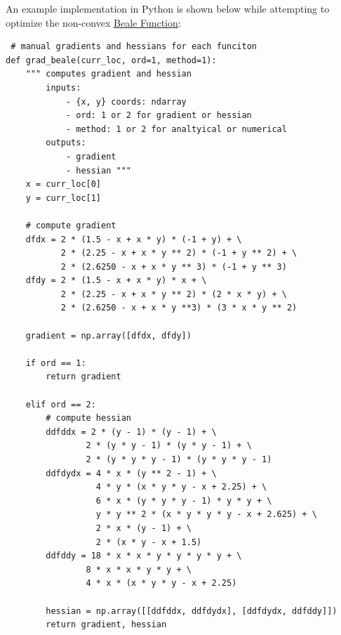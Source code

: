 \begin{tcolorbox}[colback=gray!5!white,colframe=gray!75!black]
 An example implementation in Python is shown below while attempting to optimize the non-convex \href{https://en.wikipedia.org/wiki/Test_functions_for_optimization}{Beale Function}:

 \begin{verbatim}
 # manual gradients and hessians for each funciton
def grad_beale(curr_loc, ord=1, method=1):
    """ computes gradient and hessian
        inputs:
            - {x, y} coords: ndarray
            - ord: 1 or 2 for gradient or hessian
            - method: 1 or 2 for analtyical or numerical
        outputs: 
            - gradient
            - hessian """
    x = curr_loc[0]
    y = curr_loc[1]

    # compute gradient
    dfdx = 2 * (1.5 - x + x * y) * (-1 + y) + \
           2 * (2.25 - x + x * y ** 2) * (-1 + y ** 2) + \
           2 * (2.6250 - x + x * y ** 3) * (-1 + y ** 3)
    dfdy = 2 * (1.5 - x + x * y) * x + \
           2 * (2.25 - x + x * y ** 2) * (2 * x * y) + \
           2 * (2.6250 - x + x * y **3) * (3 * x * y ** 2)

    gradient = np.array([dfdx, dfdy])
    
    if ord == 1:
        return gradient
    
    elif ord == 2:
        # compute hessian
        ddfddx = 2 * (y - 1) * (y - 1) + \
                2 * (y * y - 1) * (y * y - 1) + \
                2 * (y * y * y - 1) * (y * y * y - 1)
        ddfdydx = 4 * x * (y ** 2 - 1) + \
                  4 * y * (x * y * y - x + 2.25) + \
                  6 * x * (y * y * y - 1) * y * y + \
                  y * y ** 2 * (x * y * y * y - x + 2.625) + \
                  2 * x * (y - 1) + \
                  2 * (x * y - x + 1.5)
        ddfddy = 18 * x * x * y * y * y * y + \
                8 * x * x * y * y + \
                4 * x * (x * y * y - x + 2.25)

        hessian = np.array([[ddfddx, ddfdydx], [ddfdydx, ddfddy]])
        return gradient, hessian

 \end{verbatim}
\end{tcolorbox}

